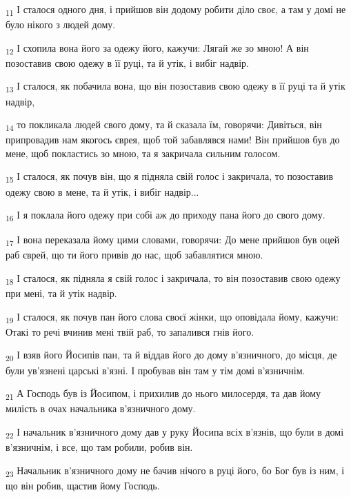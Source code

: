 \begin{tcolorbox}
\textsubscript{11} І сталося одного дня, і прийшов він додому робити діло своє, а там у домі не було нікого з людей дому.
\end{tcolorbox}
\begin{tcolorbox}
\textsubscript{12} І схопила вона його за одежу його, кажучи: Лягай же зо мною! А він позоставив свою одежу в її руці, та й утік, і вибіг надвір.
\end{tcolorbox}
\begin{tcolorbox}
\textsubscript{13} І сталося, як побачила вона, що він позоставив свою одежу в її руці та й утік надвір,
\end{tcolorbox}
\begin{tcolorbox}
\textsubscript{14} то покликала людей свого дому, та й сказала їм, говорячи: Дивіться, він припровадив нам якогось єврея, щоб той забавлявся нами! Він прийшов був до мене, щоб покластись зо мною, та я закричала сильним голосом.
\end{tcolorbox}
\begin{tcolorbox}
\textsubscript{15} І сталося, як почув він, що я підняла свій голос і закричала, то позоставив одежу свою в мене, та й утік, і вибіг надвір...
\end{tcolorbox}
\begin{tcolorbox}
\textsubscript{16} І я поклала його одежу при собі аж до приходу пана його до свого дому.
\end{tcolorbox}
\begin{tcolorbox}
\textsubscript{17} І вона переказала йому цими словами, говорячи: До мене прийшов був оцей раб єврей, що ти його привів до нас, щоб забавлятися мною.
\end{tcolorbox}
\begin{tcolorbox}
\textsubscript{18} І сталося, як підняла я свій голос і закричала, то він позоставив свою одежу при мені, та й утік надвір.
\end{tcolorbox}
\begin{tcolorbox}
\textsubscript{19} І сталося, як почув пан його слова своєї жінки, що оповідала йому, кажучи: Отакі то речі вчинив мені твій раб, то запалився гнів його.
\end{tcolorbox}
\begin{tcolorbox}
\textsubscript{20} І взяв його Йосипів пан, та й віддав його до дому в'язничного, до місця, де були ув'язнені царські в'язні. І пробував він там у тім домі в'язничнім.
\end{tcolorbox}
\begin{tcolorbox}
\textsubscript{21} А Господь був із Йосипом, і прихилив до нього милосердя, та дав йому милість в очах начальника в'язничного дому.
\end{tcolorbox}
\begin{tcolorbox}
\textsubscript{22} І начальник в'язничного дому дав у руку Йосипа всіх в'язнів, що були в домі в'язничнім, і все, що там робили, робив він.
\end{tcolorbox}
\begin{tcolorbox}
\textsubscript{23} Начальник в'язничного дому не бачив нічого в руці його, бо Бог був із ним, і що він робив, щастив йому Господь.
\end{tcolorbox}
